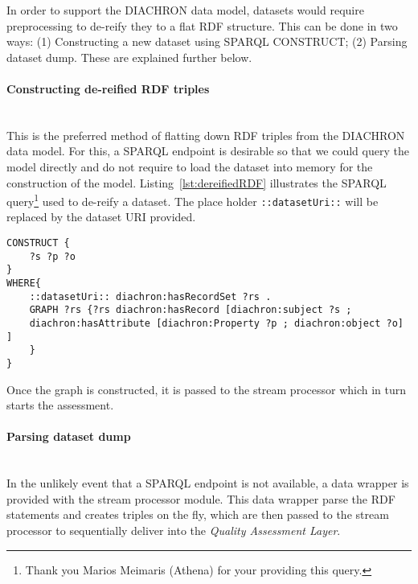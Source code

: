 In order to support the DIACHRON data model, datasets would require preprocessing to de-reify they to a flat RDF structure.
This can be done in two ways: (1) Constructing a new dataset using SPARQL CONSTRUCT; (2) Parsing dataset dump.
These are explained further below.

\paragraph{Constructing de-reified RDF triples}~\\
This is the preferred method of flatting down RDF triples from the DIACHRON data model.
For this, a SPARQL endpoint is desirable so that we could query the model directly and do not require to load the dataset into memory for the construction of the model.
Listing~\ref{lst:dereifiedRDF} illustrates the SPARQL query\footnote{Thank you Marios Meimaris (Athena) for your providing this query.} used to de-reify a dataset.
The place holder \texttt{::datasetUri::} will be replaced by the dataset URI provided.
\begin{lstlisting}[language=N3,label=lst:dereifiedRDF]
CONSTRUCT {
	?s ?p ?o
}
WHERE{
	::datasetUri:: diachron:hasRecordSet ?rs .
	GRAPH ?rs {?rs diachron:hasRecord [diachron:subject ?s ;
	diachron:hasAttribute [diachron:Property ?p ; diachron:object ?o] ]
	}
}
\end{lstlisting}
Once the graph is constructed, it is passed to the stream processor which in turn starts the assessment.

\paragraph{Parsing dataset dump}~\\
In the unlikely event that a SPARQL endpoint is not available, a data wrapper is provided with the stream processor module.
This data wrapper parse the RDF statements and creates triples on the fly, which are then passed to the stream processor to sequentially deliver into the \emph{Quality Assessment Layer}.


